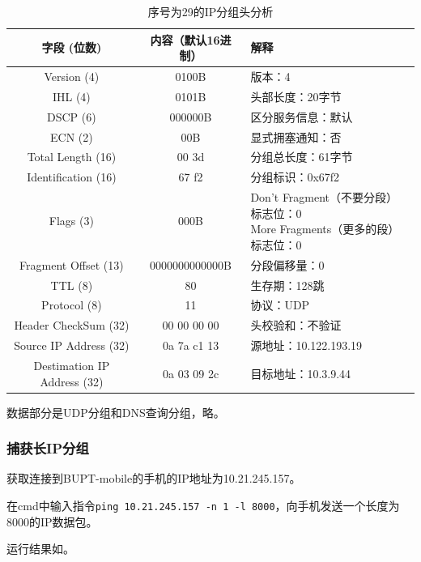 \documentclass[lang=cn,11pt,a4paper,cite=authornum]{paper}
\begin{document}
\begin{table}[!htbp]
    \centering
    \caption{序号为29的IP分组头分析\label{tab:ip0res}}
    \begin{tabular}{|c|c|l|}
        \hline
        字段 (位数) & 内容（默认16进制） & 解释 \\
        \hline
        Version (4) & 0100B & 版本：4 \\
        \hline
        IHL (4) & 0101B & 头部长度：20字节 \\
        \hline
        DSCP (6) & 000000B & 区分服务信息：默认 \\
        \hline
        ECN (2) & 00B & 显式拥塞通知：否 \\
        \hline
        Total Length (16) & 00 3d & 分组总长度：61字节 \\
        \hline
        Identification (16) & 67 f2 & 分组标识：0x67f2 \\
        \hline
        Flags (3) & 000B & \makecell[l]{Don't Fragment（不要分段）标志位：0 \\ More Fragments（更多的段）标志位：0} \\
        \hline
        Fragment Offset (13) & 0000000000000B & 分段偏移量：0 \\
        \hline
        TTL (8) & 80 & 生存期：128跳 \\
        \hline
        Protocol (8) & 11 & 协议：UDP \\
        \hline
        Header CheckSum (32) & 00 00 00 00 & 头校验和：不验证 \\
        \hline
        Source IP Address (32) & 0a 7a c1 13 & 源地址：10.122.193.19 \\
        \hline
        Destimation IP Address (32) & 0a 03 09 2c & 目标地址：10.3.9.44 \\
        \hline
    \end{tabular}
\end{table}

数据部分是UDP分组和DNS查询分组，略。

\subsubsection{捕获长IP分组}

获取连接到BUPT-mobile的手机的IP地址为10.21.245.157。

在cmd中输入指令\texttt{ping 10.21.245.157 -n 1 -l 8000}，向手机发送一个长度为8000的IP数据包。

运行结果如。
\end{document}

